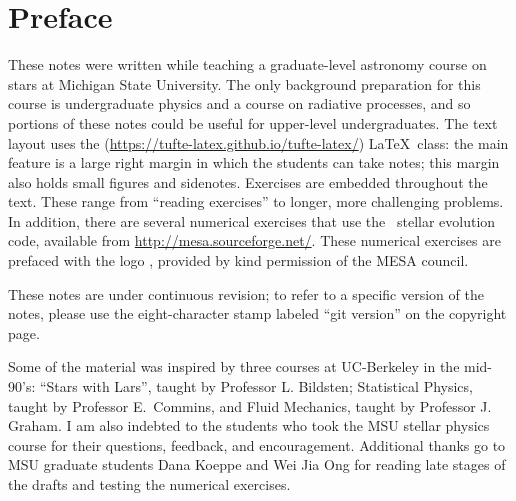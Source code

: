 
\section*{Preface}
These notes were written while teaching a graduate-level astronomy course on stars at Michigan State University.  The only background preparation for this course is undergraduate physics and a course on radiative processes, and so portions of these notes could be useful for upper-level undergraduates.  
The text layout uses the  (\url{https://tufte-latex.github.io/tufte-latex/}) \LaTeX\ class:  the main feature is a large right margin in which the students can take notes; this margin also holds small figures and sidenotes. Exercises are embedded throughout the text.  These range from ``reading exercises'' to longer, more challenging problems.  In addition, there are several numerical exercises that use the \mesa\ stellar evolution code, available from \url{http://mesa.sourceforge.net/}.  These numerical exercises are prefaced with the logo , provided by kind permission of the MESA council.

These notes are under continuous revision; to refer to a specific version of the notes, please use the eight-character stamp labeled ``git version'' on the copyright page.

Some of the material was inspired by three courses at UC-Berkeley in the mid-90's: ``Stars with Lars'', taught by Professor L. Bildsten; Statistical Physics, taught by Professor E.~Commins, and Fluid Mechanics, taught by Professor J. Graham.  I am also indebted to the students who took the MSU stellar physics course for their questions, feedback, and encouragement. Additional thanks go to MSU graduate students Dana Koeppe and Wei Jia Ong for reading late stages of the drafts and testing the numerical exercises.
